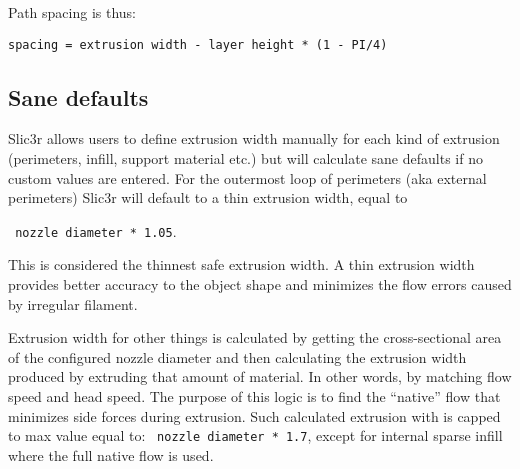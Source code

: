 Path spacing is thus:
\par \verb|spacing = extrusion width - layer height * (1 - PI/4)|

\subsection{Sane defaults}
\label{sec:sane_defaults}

Slic3r allows users to define extrusion width manually for each kind of extrusion (perimeters, infill, support material etc.) but will calculate sane defaults if no custom values are entered.
For the outermost loop of perimeters (aka external perimeters) Slic3r will default to a thin extrusion width, equal to
\par \verb| nozzle diameter * 1.05|.

This is considered the thinnest safe extrusion width. A thin extrusion width provides better accuracy to the object shape and minimizes the flow errors caused by irregular filament.

Extrusion width for other things is calculated by getting the cross-sectional area of the configured nozzle diameter and then calculating the extrusion width produced by extruding that amount of material. In other words, by matching flow speed and head speed. The purpose of this logic is to find the ``native'' flow that minimizes side forces during extrusion. Such calculated extrusion with is capped to max value equal to:
\verb| nozzle diameter * 1.7|, except for internal sparse infill where the full native flow is used.
